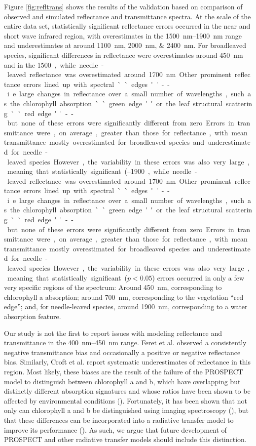 Figure \ref{fig:refltrans} shows the results of the validation based on
comparison of observed and simulated reflectance and transmittance spectra.
At the scale of the entire data set, statistically significant reflectance
errors occurred in the near and short wave infrared region, with overestimates
in the \SIrange{1500}{1900}{\nano\meter} range and underestimates at around
\SIlist{1100;2000;2400}{\nano\meter}.  For broadleaved species, significant
differences in reflectance were overestimates around \SI{450}{\nano\meter} and
in the \SIrange{1500}{1900}, while needle-leaved reflectance was overestimated
around \SI{1700}{\nano\meter}.  Other prominent reflectance errors lined up
with spectral ``edges''--i.e.  large changes in reflectance over a small
number of wavelengths, such as the chlorophyll absorption ``green edge'' or
the leaf structural scattering ``red edge''--but none of these errors were
significantly different from zero.

Errors in transmittance were, on average, greater than those for reflectance,
with mean transmittance mostly overestimated for broadleaved species and
underestimated for needle-leaved species. However, the variability in these
errors was also very large, meaning that statistically significant
($p < 0.05$) errors occurred in only a few very specific regions of the spectrum:
Around \SI{450}{\nano\meter}, corresponding to chlorophyll a absorption;
around \SI{700}{\nano\meter}, corresponding to the vegetation ``red edge'';
and, for needle-leaved species, around \SI{1900}{\nano\meter}, corresponding
to a water absorption feature.

Our study is not the first to report issues with modeling reflectance and
transmittance in the \SIrange{400}{450}{\nano\meter} range.  Feret et al.
\cite{Feret2008} observed a consistently negative transmittance bias and
occasionally a positive or negative reflectance bias.  Similarly, Croft et al.
\cite{Croft2013} report systematic underestimates of reflectance in this
region. Most likely, these biases are the result of the failure of the
PROSPECT model to distinguish between chlorophyll a and b, which
have overlapping but distinctly different absorption signatures and whose
ratios have been shown to be affected by environmental conditions
(\cite{Blackburn2007, DiVittorio2009b, DiVittorio2009a}).  Fortunately, it has
been shown that not only can chlorophyll a and b be distinguished using
imaging spectroscopy (\cite{DiVittorio2009a}), but that these differences can
be incorporated into a radiative transfer model to improve its performance
(\cite{DiVittorio2009}).  As such, we argue that future development of
PROSPECT and other radiative transfer models should include this distinction.

